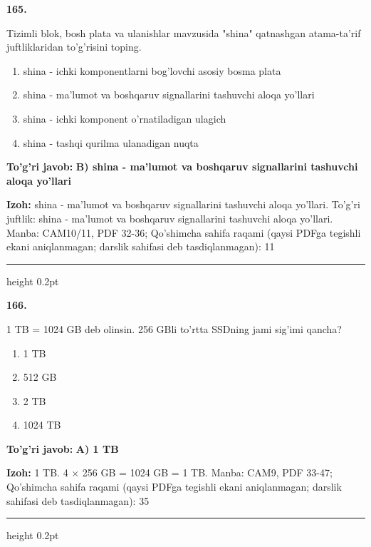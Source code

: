 \documentclass[10pt,a4paper]{article}
\begin{document}
{\bfseries\sffamily\color{ink} 165.}
\par
Tizimli blok, bosh plata va ulanishlar mavzusida "shina" qatnashgan atama-ta'rif juftliklaridan to'g'risini toping.
\begin{enumerate}[label=\Alph*),leftmargin=9mm]
\item shina - ichki komponentlarni bog'lovchi asosiy bosma plata
\item shina - ma'lumot va boshqaruv signallarini tashuvchi aloqa yo'llari
\item shina - ichki komponent o'rnatiladigan ulagich
\item shina - tashqi qurilma ulanadigan nuqta
\end{enumerate}
\begin{tcolorbox}[enhanced,breakable,colback=teal!4,colframe=teal!60!black,boxrule=0.45pt,arc=1.2mm,left=2.7mm,right=2.7mm,top=1.8mm,bottom=1.8mm,before skip=2mm,after skip=2mm]
{\bfseries\sffamily\color{teal}To'g'ri javob:} \textbf{B) shina - ma'lumot va boshqaruv signallarini tashuvchi aloqa yo'llari}
\par\smallskip
{\bfseries Izoh:} shina - ma'lumot va boshqaruv signallarini tashuvchi aloqa yo'llari. To'g'ri juftlik: shina - ma'lumot va boshqaruv signallarini tashuvchi aloqa yo'llari. Manba: CAM10/11, PDF 32-36; Qo'shimcha sahifa raqami (qaysi PDFga tegishli ekani aniqlanmagan; darslik sahifasi deb tasdiqlanmagan): 11
\end{tcolorbox}
\vspace{2mm}\hrule height 0.2pt\vspace{3mm}

{\bfseries\sffamily\color{ink} 166.}
\par
1 TB = 1024 GB deb olinsin. 256 GBli to'rtta SSDning jami sig'imi qancha?
\begin{enumerate}[label=\Alph*),leftmargin=9mm]
\item 1 TB
\item 512 GB
\item 2 TB
\item 1024 TB
\end{enumerate}
\begin{tcolorbox}[enhanced,breakable,colback=teal!4,colframe=teal!60!black,boxrule=0.45pt,arc=1.2mm,left=2.7mm,right=2.7mm,top=1.8mm,bottom=1.8mm,before skip=2mm,after skip=2mm]
{\bfseries\sffamily\color{teal}To'g'ri javob:} \textbf{A) 1 TB}
\par\smallskip
{\bfseries Izoh:} 1 TB. 4 \ensuremath{\times} 256 GB = 1024 GB = 1 TB. Manba: CAM9, PDF 33-47; Qo'shimcha sahifa raqami (qaysi PDFga tegishli ekani aniqlanmagan; darslik sahifasi deb tasdiqlanmagan): 35
\end{tcolorbox}
\vspace{2mm}\hrule height 0.2pt\vspace{3mm}
\end{document}

